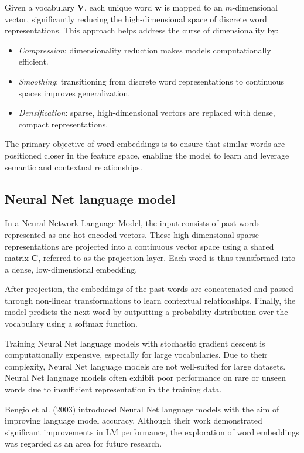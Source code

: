 Given a vocabulary $\mathbf{V}$, each unique word $\mathbf{w}$ is mapped to an $m$-dimensional vector, significantly reducing the high-dimensional space of discrete word representations.
This approach helps address the curse of dimensionality by:
\begin{itemize}
    \item \textit{Compression}: dimensionality reduction makes models computationally efficient.
    \item \textit{Smoothing}: transitioning from discrete word representations to continuous spaces improves generalization.
    \item \textit{Densification}: sparse, high-dimensional vectors are replaced with dense, compact representations.
\end{itemize}
The primary objective of word embeddings is to ensure that similar words are positioned closer in the feature space, enabling the model to learn and leverage semantic and contextual relationships.

\subsection{Neural Net language model}
In a Neural Network Language Model, the input consists of past words represented as one-hot encoded vectors. 
These high-dimensional sparse representations are projected into a continuous vector space using a shared matrix $\mathbf{C}$, referred to as the projection layer. 
Each word is thus transformed into a dense, low-dimensional embedding.

After projection, the embeddings of the past words are concatenated and passed through non-linear transformations to learn contextual relationships. 
Finally, the model predicts the next word by outputting a probability distribution over the vocabulary using a softmax function.

Training Neural Net language models with stochastic gradient descent is computationally expensive, especially for large vocabularies.
Due to their complexity, Neural Net language models are not well-suited for large datasets.
Neural Net language models often exhibit poor performance on rare or unseen words due to insufficient representation in the training data.

Bengio et al. (2003) introduced Neural Net language models with the aim of improving language model accuracy. 
Although their work demonstrated significant improvements in LM performance, the exploration of word embeddings was regarded as an area for future research.

